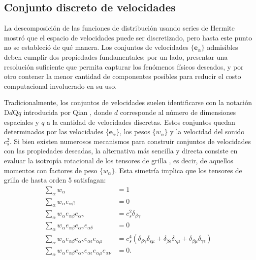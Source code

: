 \subsection{Conjunto discreto de velocidades}
La descomposici\'on de las funciones de distribuci\'on usando series de Hermite mostr\'o que el espacio de velocidades puede ser discretizado, pero hasta este punto no se estableci\'o de qu\'e manera. Los conjuntos de velocidades $\{\bm{e}_{\alpha}\}$ admisibles deben cumplir dos propiedades fundamentales; por un lado, presentar una resoluci\'on suficiente que permita capturar los fen\'omenos f\'isicos deseados, y por otro contener la menor cantidad de componentes posibles para reducir el costo computacional involucrado en su uso.
\par 
Tradicionalmente, los conjuntos de velocidades suelen identificarse con la notaci\'on D$d$Q$q$ introducida por Qian \cite{qian_lattice_1992}, donde $d$ corresponde al n\'umero de dimensiones espaciales y $q$ a la cantidad de velocidades discretas. Estos conjuntos quedan determinados por las velocidades $\{\bm{e}_{\alpha}\}$, los pesos $\{w_{\alpha}\}$ y la velocidad del sonido $c_s^2$. Si bien existen numerosos mecanismos para construir conjuntos de velocidades con las propiedades deseadas, la alternativa m\'as sencilla y directa consiste en evaluar la isotrop\'ia rotacional de los tensores de grilla \cite{guo_lattice_2013,frisch_lattice_1987}, es decir, de aquellos momentos con factores de peso $\{w_{\alpha}\}$. Esta simetr\'ia implica que los tensores de grilla de hasta orden 5 satisfagan:
\begin{subequations}
	\begin{align}
	\sum_{\alpha} w_{\alpha} &= 1 \\
	\sum_{\alpha} w_{\alpha} e_{\alpha\beta} &= 0 \\
	\sum_{\alpha} w_{\alpha} e_{\alpha\beta} e_{{\alpha}\gamma} &= c_s^2 \delta_{\beta\gamma} \\
	\sum_{\alpha} w_{\alpha} e_{\alpha\beta} e_{{\alpha}\gamma} e_{{\alpha}\delta} &= 0 \\
	\sum_{\alpha} w_{\alpha} e_{\alpha\beta} e_{{\alpha}\gamma} e_{{\alpha}\epsilon} e_{{\alpha}\mu} &= c_s^4(\delta_{\beta\gamma}\delta_{\epsilon\mu} + \delta_{\beta\epsilon}\delta_{\gamma\mu} + \delta_{\beta\mu}\delta_{\gamma\epsilon}) \\
	\sum_{\alpha} w_{\alpha} e_{\alpha\beta} e_{{\alpha}\gamma} e_{{\alpha}\epsilon} e_{{\alpha}\mu} e_{{\alpha}\nu} &= 0.
	\end{align}
	\label{eq:tensores_grilla}	
\end{subequations}

